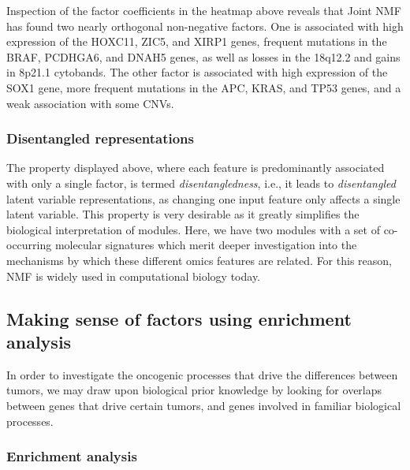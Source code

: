 \documentclass[12pt,]{krantz}
\begin{document}
Inspection of the factor coefficients in the heatmap above reveals that Joint NMF has found two nearly orthogonal non-negative factors. One is associated with high expression of the HOXC11, ZIC5, and XIRP1 genes, frequent mutations in the BRAF, PCDHGA6, and DNAH5 genes, as well as losses in the 18q12.2 and gains in 8p21.1 cytobands. The other factor is associated with high expression of the SOX1 gene, more frequent mutations in the APC, KRAS, and TP53 genes, and a weak association with some CNVs.

\hypertarget{disentangled-representations}{%
\subsubsection{Disentangled representations}\label{disentangled-representations}}

The property displayed above, where each feature is predominantly associated with only a single factor, is termed \emph{disentangledness}, i.e., it leads to \emph{disentangled} latent variable representations, as changing one input feature only affects a single latent variable. This property is very desirable as it greatly simplifies the biological interpretation of modules. Here, we have two modules with a set of co-occurring molecular signatures which merit deeper investigation into the mechanisms by which these different omics features are related. For this reason, NMF is widely used in computational biology today.

\hypertarget{making-sense-of-factors-using-enrichment-analysis}{%
\subsection{Making sense of factors using enrichment analysis}\label{making-sense-of-factors-using-enrichment-analysis}}

In order to investigate the oncogenic processes that drive the differences between tumors, we may draw upon biological prior knowledge by looking for overlaps between genes that drive certain tumors, and genes involved in familiar biological processes.

\hypertarget{enrichment-analysis}{%
\subsubsection{Enrichment analysis}\label{enrichment-analysis}}
\end{document}
